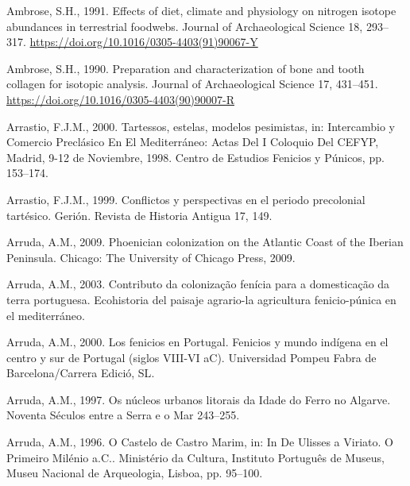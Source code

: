 \documentclass[3p]{elsarticle} %
\newlength{\cslhangindent}
\newlength{\cslentryspacingunit} %
\newenvironment{CSLReferences}[2] %
 {%
  \setlength{\parindent}{0pt}
  \ifodd #1
  \let\oldpar\par
  \def\par{\hangindent=\cslhangindent\oldpar}
  \fi
  \setlength{\parskip}{#2\cslentryspacingunit}
 }%
 {}
\begin{document}
\hypertarget{refs}{}
\begin{CSLReferences}{1}{0}
\leavevmode{}%
Ambrose, S.H., 1991. Effects of diet, climate and physiology on nitrogen isotope abundances in terrestrial foodwebs. Journal of Archaeological Science 18, 293--317. \url{https://doi.org/10.1016/0305-4403(91)90067-Y}

\leavevmode{}%
Ambrose, S.H., 1990. Preparation and characterization of bone and tooth collagen for isotopic analysis. Journal of Archaeological Science 17, 431--451. \url{https://doi.org/10.1016/0305-4403(90)90007-R}

\leavevmode{}%
Arrastio, F.J.M., 2000. Tartessos, estelas, modelos pesimistas, in: Intercambio y Comercio Preclásico En El {Mediterráneo}: Actas Del {I} Coloquio Del {CEFYP}, {Madrid}, 9-12 de Noviembre, 1998. {Centro de Estudios Fenicios y Púnicos}, pp. 153--174.

\leavevmode{}%
Arrastio, F.J.M., 1999. Conflictos y perspectivas en el periodo precolonial tartésico. Gerión. Revista de Historia Antigua 17, 149.

\leavevmode{}%
Arruda, A.M., 2009. Phoenician colonization on the {Atlantic Coast} of the {Iberian Peninsula}. {Chicago: The University of Chicago Press, 2009.}

\leavevmode{}%
Arruda, A.M., 2003. Contributo da colonização fenícia para a domesticação da terra portuguesa. Ecohistoria del paisaje agrario-la agricultura fenicio-púnica en el mediterráneo.

\leavevmode{}%
Arruda, A.M., 2000. Los fenicios en {Portugal}. {Fenicios} y mundo indígena en el centro y sur de {Portugal} (siglos {VIII}-{VI aC}). {Universidad Pompeu Fabra de Barcelona/Carrera Edició, SL}.

\leavevmode{}%
Arruda, A.M., 1997. Os núcleos urbanos litorais da {Idade} do {Ferro} no {Algarve}. Noventa Séculos entre a Serra e o Mar 243--255.

\leavevmode{}%
Arruda, A.M., 1996. O {Castelo} de {Castro Marim}, in: In {De Ulisses} a {Viriato}. {O} Primeiro Milénio a.{C}.. {Ministério da Cultura, Instituto Português de Museus, Museu Nacional de Arqueologia}, {Lisboa}, pp. 95--100.


\end{CSLReferences}
\end{document}
